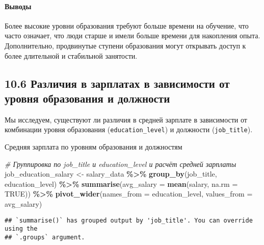 \documentclass[
]{article}
\newenvironment{Shaded}{\begin{snugshade}}{\end{snugshade}}
\newcommand{\AttributeTok}[1]{\textcolor[rgb]{0.13,0.29,0.53}{#1}}
\newcommand{\CommentTok}[1]{\textcolor[rgb]{0.56,0.35,0.01}{\textit{#1}}}
\newcommand{\ConstantTok}[1]{\textcolor[rgb]{0.56,0.35,0.01}{#1}}
\newcommand{\FunctionTok}[1]{\textcolor[rgb]{0.13,0.29,0.53}{\textbf{#1}}}
\newcommand{\NormalTok}[1]{#1}
\newcommand{\OtherTok}[1]{\textcolor[rgb]{0.56,0.35,0.01}{#1}}
\newcommand{\SpecialCharTok}[1]{\textcolor[rgb]{0.81,0.36,0.00}{\textbf{#1}}}
\begin{document}
\paragraph{Выводы}\label{ux432ux44bux432ux43eux434ux44b-1}

Более высокие уровни образования требуют больше времени на обучение, что
часто означает, что люди старше и имели больше времени для накопления
опыта. Дополнительно, продвинутые ступени образования могут открывать
доступ к более длительной и стабильной занятости.

\subsection{10.6 Различия в зарплатах в зависимости от уровня
образования и
должности}\label{ux440ux430ux437ux43bux438ux447ux438ux44f-ux432-ux437ux430ux440ux43fux43bux430ux442ux430ux445-ux432-ux437ux430ux432ux438ux441ux438ux43cux43eux441ux442ux438-ux43eux442-ux443ux440ux43eux432ux43dux44f-ux43eux431ux440ux430ux437ux43eux432ux430ux43dux438ux44f-ux438-ux434ux43eux43bux436ux43dux43eux441ux442ux438}

Мы исследуем, существуют ли различия в средней зарплате в зависимости от
комбинации уровня образования (\texttt{education\_level}) и должности
(\texttt{job\_title}).

Средняя зарплата по уровням образования и должностям

\begin{Shaded}
\begin{Highlighting}[]
\CommentTok{\# Группировка по job\_title и education\_level и расчёт средней зарплаты}
\NormalTok{job\_education\_salary }\OtherTok{\textless{}{-}}\NormalTok{ salary\_data }\SpecialCharTok{\%\textgreater{}\%}
  \FunctionTok{group\_by}\NormalTok{(job\_title, education\_level) }\SpecialCharTok{\%\textgreater{}\%}
  \FunctionTok{summarise}\NormalTok{(}\AttributeTok{avg\_salary =} \FunctionTok{mean}\NormalTok{(salary, }\AttributeTok{na.rm =} \ConstantTok{TRUE}\NormalTok{)) }\SpecialCharTok{\%\textgreater{}\%}
  \FunctionTok{pivot\_wider}\NormalTok{(}\AttributeTok{names\_from =}\NormalTok{ education\_level, }\AttributeTok{values\_from =}\NormalTok{ avg\_salary)}
\end{Highlighting}
\end{Shaded}

\begin{verbatim}
## `summarise()` has grouped output by 'job_title'. You can override using the
## `.groups` argument.
\end{verbatim}
\end{document}
